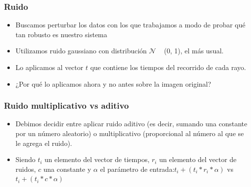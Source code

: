 \documentclass[11pt]{beamer}
\begin{document}
\begin{frame}
\frametitle{Ruido}

\begin{itemize}
\item Buscamos perturbar los datos con los que trabajamos a modo de probar qué tan robusto es nuestro sistema

\item Utilizamos ruido gaussiano con distribución $\mathcal{N}$ ~ (0, 1), el más usual. 

\item Lo aplicamos al vector $t$ que contiene los tiempos del recorrido de cada rayo.

\item ¿Por qué lo aplicamos ahora y no antes sobre la imagen original?

\end{itemize}

\end{frame}


\begin{frame}
    \frametitle{Ruido multiplicativo vs aditivo}
	\begin{itemize}
	\item Debimos decidir entre aplicar ruido aditivo (es decir, sumando una constante por un número aleatorio) o multiplicativo (proporcional al número al que se le agrega el ruido).

	\item Siendo $t_i$ un elemento del vector de tiempos, $r_i$ un elemento del vector de ruidos, $c$ una constante y $\alpha$ el parámetro de entrada:\newline $t_i + (t_i * r_i * \alpha)$ vs $t_i + (t_i * c * \alpha)$
	
	\end{itemize}

\end{frame}
\end{document}

